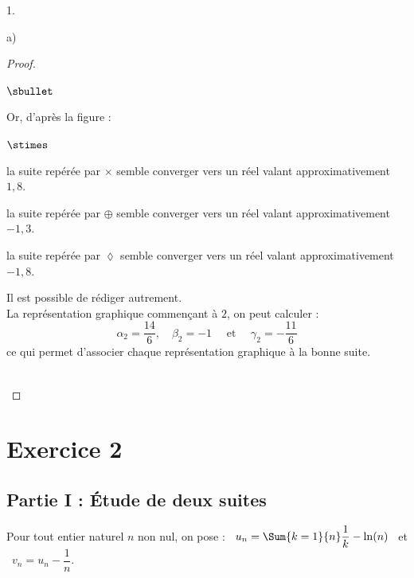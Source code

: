\begin{noliste}{1.}
\begin{noliste}{a)}
\begin{proof}
\begin{noliste}{$\sbullet$}
      \item Or, d'après la figure :
        \begin{noliste}{$\stimes$}
        \item la suite repérée par $\times$ semble converger vers un
          réel valant approximativement $1,8$.%
        \item la suite repérée par $\oplus$ semble converger vers un
          réel valant approximativement $-1,3$.%
        \item la suite repérée par $\lozenge$ semble converger vers un
          réel valant approximativement $-1,8$.%
        \end{noliste}
      \end{noliste}
      \begin{remark}%
        Il est possible de rédiger autrement.\\
        La représentation graphique commençant à $2$, on peut calculer
        :
        \[
        \alpha_2 = \dfrac{14}{6}, \quad \beta_2 = -1 \quad \text{ et }
        \quad \gamma_2 = -\dfrac{11}{6}
        \]
        ce qui permet d'associer chaque représentation graphique à la
        bonne suite.
      \end{remark}~\\[-1.2cm]
    \end{proof}
  \end{noliste}
\end{noliste}

\section*{Exercice 2}

\subsection*{Partie I : Étude de deux suites}

\noindent
Pour tout entier naturel $n$ non nul, on pose : \ $u_{n} = \Sum{k =
  1}{n} \dfrac{1}{k} - \ln(n)$ \ et \ $v_{n} = u_{n} - \dfrac{1}{n}$.

